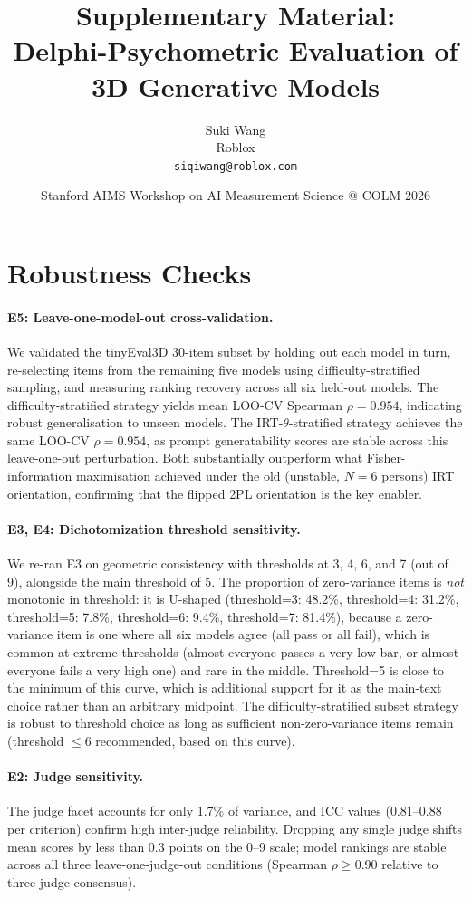 \documentclass[10pt]{article}
\title{Supplementary Material:\\
       Delphi-Psychometric Evaluation of 3D Generative Models}
\author{Suki Wang \\ Roblox \\ \texttt{siqiwang@roblox.com}}
\date{Stanford AIMS Workshop on AI Measurement Science @ COLM 2026}
\begin{document}
\maketitle

\section{Robustness Checks}
\label{app:robustness}

\paragraph{E5: Leave-one-model-out cross-validation.}
We validated the tinyEval3D 30-item subset by holding out each model in turn,
re-selecting items from the remaining five models using difficulty-stratified
sampling, and measuring ranking recovery across all six held-out models.
The difficulty-stratified strategy yields mean LOO-CV Spearman $\rho=0.954$,
indicating robust generalisation to unseen models.
The IRT-$\theta$-stratified strategy achieves the same LOO-CV $\rho=0.954$,
as prompt generatability scores are stable across this leave-one-out perturbation.
Both substantially outperform what Fisher-information maximisation achieved
under the old (unstable, $N=6$ persons) IRT orientation, confirming that the
flipped 2PL orientation is the key enabler.

\paragraph{E3, E4: Dichotomization threshold sensitivity.}
We re-ran E3 on geometric consistency with thresholds at 3, 4, 6, and 7
(out of 9), alongside the main threshold of 5.
The proportion of zero-variance items is \emph{not} monotonic in threshold:
it is U-shaped (threshold=3: 48.2\%, threshold=4: 31.2\%, threshold=5:
7.8\%, threshold=6: 9.4\%, threshold=7: 81.4\%), because a zero-variance
item is one where all six models agree (all pass or all fail), which is
common at extreme thresholds (almost everyone passes a very low bar, or
almost everyone fails a very high one) and rare in the middle. Threshold=5
is close to the minimum of this curve, which is additional support for it
as the main-text choice rather than an arbitrary midpoint. The
difficulty-stratified subset strategy is robust to threshold choice as long
as sufficient non-zero-variance items remain (threshold $\leq 6$
recommended, based on this curve).

\paragraph{E2: Judge sensitivity.}
The judge facet accounts for only 1.7\% of variance, and ICC values
(0.81--0.88 per criterion) confirm high inter-judge reliability.
Dropping any single judge shifts mean scores by less than 0.3 points on the
0--9 scale; model rankings are stable across all three leave-one-judge-out
conditions (Spearman $\rho\geq0.90$ relative to three-judge consensus).
\end{document}

